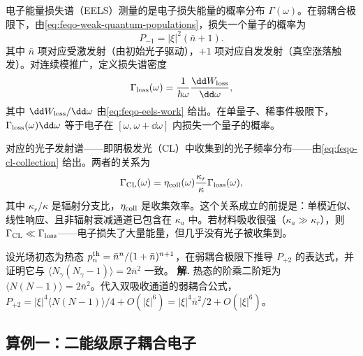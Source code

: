 电子能量损失谱（EELS）测量的是电子损失能量的概率分布 \(\Gamma(\omega)\)。在弱耦合极限下，由\cref{eq:feqo-weak-quantum-populations}，损失一个量子的概率为
\begin{equation}
P_{-1}=|\xi|^2(\bar n+1).
\label{eq:feqo-eels-emission}
\end{equation}
其中 \(\bar n\) 项对应受激发射（由初始光子驱动），\(+1\) 项对应自发发射（真空涨落触发）。对连续模推广，定义损失谱密度
\begin{equation}
\Gamma_{\rm loss}(\omega)=\frac{1}{\hbar\omega}
\frac{\dd W_{\rm loss}}{\dd\omega},
\label{eq:feqo-eels-spectral-density}
\end{equation}
其中 \(\dd W_{\rm loss}/\dd\omega\) 由\cref{eq:feqo-eels-work} 给出。在单量子、稀事件极限下，\(\Gamma_{\rm loss}(\omega)\dd\omega\) 等于电子在 \([\omega,\omega+\dd\omega]\) 内损失一个量子的概率。

对应的光子发射谱——即阴极发光（CL）中收集到的光子频率分布——由\cref{eq:feqo-cl-collection} 给出。两者的关系为
\begin{equation}
\Gamma_{\rm CL}(\omega)=\eta_{\rm coll}(\omega)
\frac{\kappa_r}{\kappa}\Gamma_{\rm loss}(\omega),
\label{eq:feqo-eels-cl-relation}
\end{equation}
其中 \(\kappa_r/\kappa\) 是辐射分支比，\(\eta_{\rm coll}\) 是收集效率。这个关系成立的前提是：单模近似、线性响应、且非辐射衰减通道已包含在 \(\kappa_a\) 中。若材料吸收很强（\(\kappa_a\gg\kappa_r\)），则 \(\Gamma_{\rm CL}\ll\Gamma_{\rm loss}\)——电子损失了大量能量，但几乎没有光子被收集到。


\par
\begin{workedexample}
设光场初态为热态 \(p_n^{\rm th}=\bar n^n/(1+\bar n)^{n+1}\)，在弱耦合极限下推导 \(P_{+2}\) 的表达式，并证明它与 \(\langle N_\gamma(N_\gamma-1)\rangle=2\bar n^2\) 一致。
\textbf{解.} 热态的阶乘二阶矩为 \(\langle N(N-1)\rangle=2\bar n^2\)。代入双吸收通道的弱耦合公式，\(P_{+2}=|\xi|^4\langle N(N-1)\rangle/4+O(|\xi|^6)=|\xi|^4\bar n^2/2+O(|\xi|^6)\)。
\end{workedexample}
\par
\subsection{算例一：二能级原子耦合电子}

